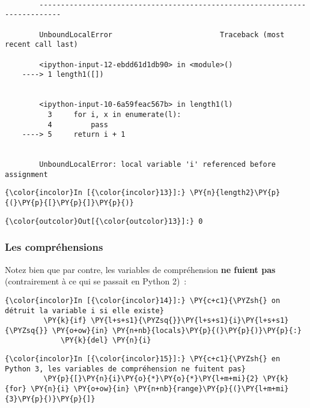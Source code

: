     \begin{Verbatim}[commandchars=\\\{\}]

        ---------------------------------------------------------------------------

        UnboundLocalError                         Traceback (most recent call last)

        <ipython-input-12-ebdd61d1db90> in <module>()
    ----> 1 length1([])
    

        <ipython-input-10-6a59feac567b> in length1(l)
          3     for i, x in enumerate(l):
          4         pass
    ----> 5     return i + 1
    

        UnboundLocalError: local variable 'i' referenced before assignment

    \end{Verbatim}

    \begin{Verbatim}[commandchars=\\\{\}]
{\color{incolor}In [{\color{incolor}13}]:} \PY{n}{length2}\PY{p}{(}\PY{p}{[}\PY{p}{]}\PY{p}{)}
\end{Verbatim}


\begin{Verbatim}[commandchars=\\\{\}]
{\color{outcolor}Out[{\color{outcolor}13}]:} 0
\end{Verbatim}
            
    \hypertarget{les-compruxe9hensions}{%
\subsubsection{Les compréhensions}\label{les-compruxe9hensions}}

    Notez bien que par contre, les variables de compréhension \textbf{ne
fuient pas} (contrairement à ce qui se passait en Python 2)~:

    \begin{Verbatim}[commandchars=\\\{\}]
{\color{incolor}In [{\color{incolor}14}]:} \PY{c+c1}{\PYZsh{} on détruit la variable i si elle existe}
         \PY{k}{if} \PY{l+s+s1}{\PYZsq{}}\PY{l+s+s1}{i}\PY{l+s+s1}{\PYZsq{}} \PY{o+ow}{in} \PY{n+nb}{locals}\PY{p}{(}\PY{p}{)}\PY{p}{:} 
             \PY{k}{del} \PY{n}{i}   
\end{Verbatim}


    \begin{Verbatim}[commandchars=\\\{\}]
{\color{incolor}In [{\color{incolor}15}]:} \PY{c+c1}{\PYZsh{} en Python 3, les variables de compréhension ne fuitent pas}
         \PY{p}{[}\PY{n}{i}\PY{o}{*}\PY{o}{*}\PY{l+m+mi}{2} \PY{k}{for} \PY{n}{i} \PY{o+ow}{in} \PY{n+nb}{range}\PY{p}{(}\PY{l+m+mi}{3}\PY{p}{)}\PY{p}{]}
\end{Verbatim}


